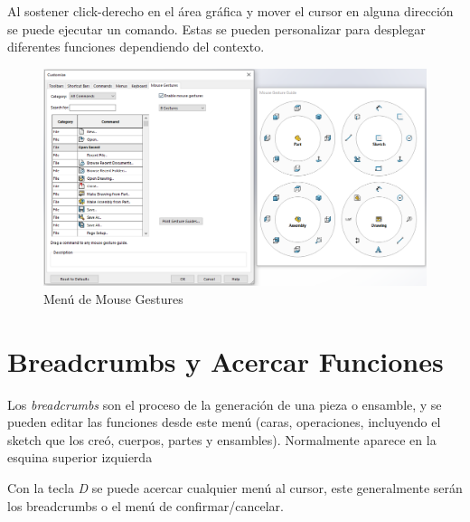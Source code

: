 \documentclass{report}
\begin{document}
Al sostener click-derecho en el área gráfica y mover el cursor en alguna dirección se puede ejecutar un comando. Estas se pueden personalizar para desplegar diferentes funciones dependiendo del contexto.

\begin{figure}[H]
	\centering
	\includegraphics[width=0.95\linewidth, height=0.75\textheight,keepaspectratio]{Imagenes/solidworks_mousegestures_01}
	\caption{Menú de Mouse Gestures}
	\label{fig:solidworksmousegestures01}
\end{figure}


\chapter{Breadcrumbs y Acercar Funciones}

Los \emph{breadcrumbs} son el proceso de la generación de una pieza o ensamble, y se pueden editar las funciones desde este menú (caras, operaciones, incluyendo el sketch que los creó, cuerpos, partes y ensambles). Normalmente aparece en la esquina superior izquierda

Con la tecla \emph{D} se puede acercar cualquier menú al cursor, este generalmente serán los breadcrumbs o el menú de confirmar/cancelar.
\end{document}
